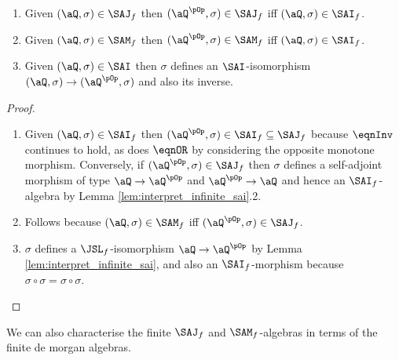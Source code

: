 \documentclass{article}
\begin{document}
\begin{corollary}
\item
\begin{enumerate}
\item
Given $(\aQ,\sigma) \in \SAJ_f$ then $(\aQ^{\pOp},\sigma) \in \SAJ_f$ iff $(\aQ,\sigma) \in \SAI_f$. 
\item
Given $(\aQ,\sigma) \in \SAM_f$ then $(\aQ^{\pOp},\sigma) \in \SAM_f$ iff $(\aQ,\sigma) \in \SAI_f$. 
\item
Given $(\aQ,\sigma) \in \SAI$ then $\sigma$ defines an $\SAI$-isomorphism $(\aQ,\sigma) \to (\aQ^{\pOp},\sigma)$ and also its inverse.

\end{enumerate}
\end{corollary}

\begin{proof}
\item
\begin{enumerate}
\item
Given $(\aQ,\sigma) \in \SAI_f$ then $(\aQ^{\pOp},\sigma) \in \SAI_f \subseteq \SAJ_f$ because $\eqnInv$ continues to hold, as does $\eqnOR$ by considering the opposite monotone morphism. Conversely, if $(\aQ^{\pOp},\sigma) \in \SAJ_f$ then $\sigma$ defines a self-adjoint morphism of type $\aQ \to \aQ^{\pOp}$ and $\aQ^{\pOp} \to \aQ$ and hence an $\SAI_f$-algebra by Lemma \ref{lem:interpret_infinite_sai}.2.

\item
Follows because $(\aQ,\sigma) \in \SAM_f$ iff $(\aQ^{\pOp},\sigma) \in \SAJ_f$.

\item
$\sigma$ defines a $\JSL_f$-isomorphism $\aQ \to \aQ^{\pOp}$ by Lemma \ref{lem:interpret_infinite_sai}, and also an $\SAI_f$-morphism because $\sigma \circ \sigma = \sigma \circ \sigma$.

\end{enumerate}
\end{proof}

\smallskip
We can also characterise the finite $\SAJ_f$ and $\SAM_f$-algebras in terms of the finite de morgan algebras.

\smallskip
\end{document}

